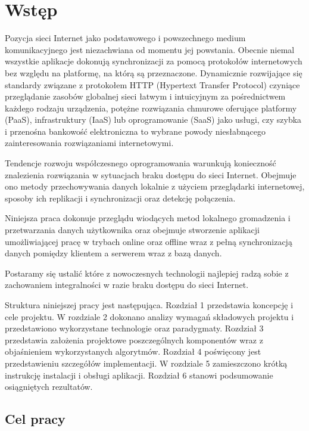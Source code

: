 \chapter{Wstęp}
\label{cha:wstep}

Pozycja sieci Internet jako podstawowego i powszechnego medium komunikacyjnego jest niezachwiana od momentu jej powstania. Obecnie niemal wszystkie aplikacje dokonują synchronizacji za pomocą protokołów internetowych bez względu na platformę, na którą są przeznaczone. Dynamicznie rozwijające się standardy związane z protokołem HTTP (Hypertext Transfer Protocol) czyniące przeglądanie zasobów globalnej sieci łatwym i intuicyjnym za pośrednictwem każdego rodzaju urządzenia, potężne rozwiązania chmurowe oferujące platformy (PaaS), infrastruktury (IaaS) lub oprogramowanie (SaaS) jako usługi, czy szybka i przenośna bankowość elektroniczna to wybrane powody niesłabnącego zainteresowania rozwiązaniami internetowymi.

Tendencje rozwoju współczesnego oprogramowania warunkują konieczność znalezienia rozwiązania w sytuacjach braku dostępu do sieci Internet. Obejmuje ono metody przechowywania danych lokalnie z użyciem przeglądarki internetowej, sposoby ich replikacji i synchronizacji oraz detekcję połączenia.

Niniejsza praca dokonuje przeglądu wiodących metod lokalnego gromadzenia i przetwarzania danych użytkownika oraz obejmuje stworzenie aplikacji umożliwiającej pracę w trybach online oraz offline wraz z pełną synchronizacją danych pomiędzy klientem a serwerem wraz z bazą danych.

Postaramy się ustalić które z nowoczesnych technologii najlepiej radzą sobie z zachowaniem integralności w razie braku dostępu do sieci Internet.

Struktura niniejszej pracy jest następująca. Rozdział 1 przedstawia koncepcję i cele projektu. W rozdziale 2 dokonano analizy wymagań składowych projektu i przedstawiono wykorzystane technologie oraz paradygmaty. Rozdział 3 przedstawia założenia projektowe poszczególnych komponentów wraz z objaśnieniem wykorzystanych algorytmów. Rozdział 4 poświęcony jest przedstawieniu szczegółów implementacji. W rozdziale 5 zamieszczono krótką instrukcję instalacji i obsługi aplikacji. Rozdział 6 stanowi podsumowanie osiągniętych rezultatów.


\section{Cel pracy}
\label{sec:celPracy}


